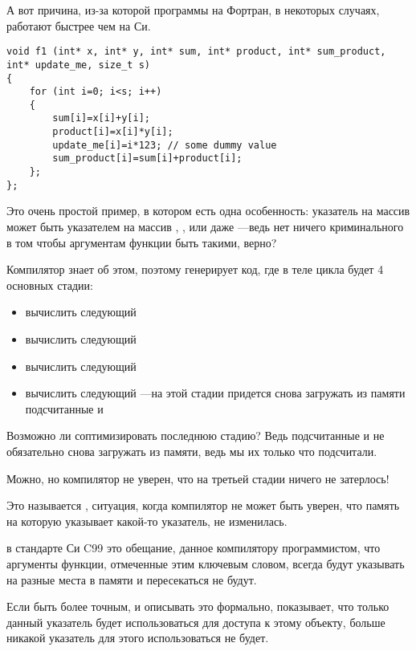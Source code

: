 
А вот причина, из-за которой программы на Фортран, в некоторых случаях, работают быстрее чем на Си.

\begin{lstlisting}[style=customc]
void f1 (int* x, int* y, int* sum, int* product, int* sum_product, int* update_me, size_t s)
{
	for (int i=0; i<s; i++)
	{
		sum[i]=x[i]+y[i];
		product[i]=x[i]*y[i];
		update_me[i]=i*123; // some dummy value
		sum_product[i]=sum[i]+product[i];	
	};
};
\end{lstlisting}

Это очень простой пример, в котором есть одна особенность: 
указатель на массив  может быть указателем на массив
, , или даже 
---ведь нет ничего криминального в том 
чтобы аргументам функции быть такими, верно?

Компилятор знает об этом, поэтому генерирует код, где в теле цикла будет 4 основных стадии:

\begin{itemize}
\item вычислить следующий 
\item вычислить следующий 
\item вычислить следующий 
\item вычислить следующий ---на этой стадии придется снова загружать из памяти подсчитанные
  и 
\end{itemize}

Возможно ли соптимизировать последнюю стадию?
Ведь подсчитанные  и  
не обязательно снова загружать из памяти, ведь мы их только что подсчитали.

Можно, но компилятор не уверен, что на третьей стадии ничего не затерлось!

Это называется
, ситуация, когда компилятор не может быть уверен, что память на которую указывает 
какой-то указатель, не изменилась.

 в стандарте Си C99 
это обещание, данное компилятору программистом, что аргументы функции, отмеченные этим ключевым словом,
всегда будут указывать на разные места в памяти и пересекаться не будут.

Если быть более точным, и описывать это формально,  показывает, что только данный указатель будет
использоваться для доступа к этому объекту, больше никакой указатель для
этого использоваться не будет.

